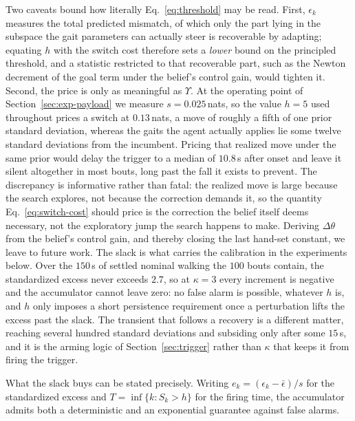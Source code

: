 \documentclass[letterpaper, 10 pt, conference]{ieeeconf}  %
\begin{document}
Two caveats bound how literally Eq.~\ref{eq:threshold} may be read.
First, $\epsilon_k$ measures the total predicted mismatch, of which only the part lying in the subspace the gait parameters can actually steer is recoverable by adapting; equating $h$ with the switch cost therefore sets a \emph{lower} bound on the principled threshold, and a statistic restricted to that recoverable part, such as the Newton decrement of the goal term under the belief's control gain, would tighten it.
Second, the price is only as meaningful as $\Upsilon$.
At the operating point of Section~\ref{sec:exp-payload} we measure $s = 0.025$\,nats, so the value $h = 5$ used throughout prices a switch at $0.13$\,nats, a move of roughly a fifth of one prior standard deviation, whereas the gaits the agent actually applies lie some twelve standard deviations from the incumbent.
Pricing that realized move under the same prior would delay the trigger to a median of $10.8$\,s after onset and leave it silent altogether in most bouts, long past the fall it exists to prevent.
The discrepancy is informative rather than fatal: the realized move is large because the search explores, not because the correction demands it, so the quantity Eq.~\ref{eq:switch-cost} should price is the correction the belief itself deems necessary, not the exploratory jump the search happens to make.
Deriving $\Delta\theta$ from the belief's control gain, and thereby closing the last hand-set constant, we leave to future work.
The slack is what carries the calibration in the experiments below.
Over the $150$\,s of settled nominal walking the $100$ bouts contain, the standardized excess never exceeds $2.7$, so at $\kappa = 3$ every increment is negative and the accumulator cannot leave zero: no false alarm is possible, whatever $h$ is, and $h$ only imposes a short persistence requirement once a perturbation lifts the excess past the slack.
The transient that follows a recovery is a different matter, reaching several hundred standard deviations and subsiding only after some $15$\,s, and it is the arming logic of Section~\ref{sec:trigger} rather than $\kappa$ that keeps it from firing the trigger.

What the slack buys can be stated precisely.
Writing $e_k = (\epsilon_k - \bar{\epsilon})/s$ for the standardized excess and $T = \inf\{k : S_k > h\}$ for the firing time, the accumulator admits both a deterministic and an exponential guarantee against false alarms.
\end{document}
